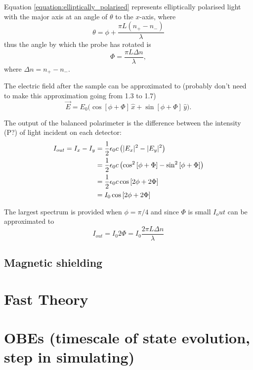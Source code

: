 Equation \ref{equation:elliptically_polarised} represents elliptically polarised light with the major axis at an angle of $\theta$ to the $x$-axis, where
\begin{equation}
\theta = \phi + \frac{\pi L (n_+ - n_-)}{\lambda}
\end{equation}
thus the angle by which the probe has rotated is
\begin{equation}
\Phi = \frac{\pi L \Delta n}{\lambda},
\end{equation}
where $\Delta n = n_+ - n_-$.

The electric field after the sample can be approximated to {\color{red}(probably don't need to make this approximation going from 1.3 to 1.7)}
\begin{equation}
\vec{E} = E_0\big(\cos\left[\phi+\Phi\right]\,\hat{x}+\sin\left[\phi+\Phi\right]\,\hat{y}\big).
\end{equation}

The output of the balanced polarimeter is the difference between the intensity {\color{red}(P?)} of light incident on each detector:
\begin{align}
I_{out} = I_x - I_y &= \frac{1}{2}\epsilon_0 c \left(|E_x|^2 - |E_y|^2\right)\notag\\
&= \frac{1}{2}\epsilon_0 c \left(\cos^2\left[\phi+\Phi\right] - \sin^2\left[\phi+\Phi\right]\right)\notag\\
&= \frac{1}{2}\epsilon_0 c \cos\left[2\phi+2\Phi\right]\notag\\
&= I_0 \cos\left[2\phi+2\Phi\right]
\end{align}

The largest spectrum is provided when $\phi=\pi/4$ and since $\Phi$ is small $I_out$ can be approximated to
\begin{equation}
I_{out} = I_0 2\Phi = I_0 \frac{2\pi L \Delta n}{\lambda}
\end{equation}

\subsection{Magnetic shielding}

\section{Fast Theory}

\section{OBEs (timescale of state evolution, step in simulating)}

